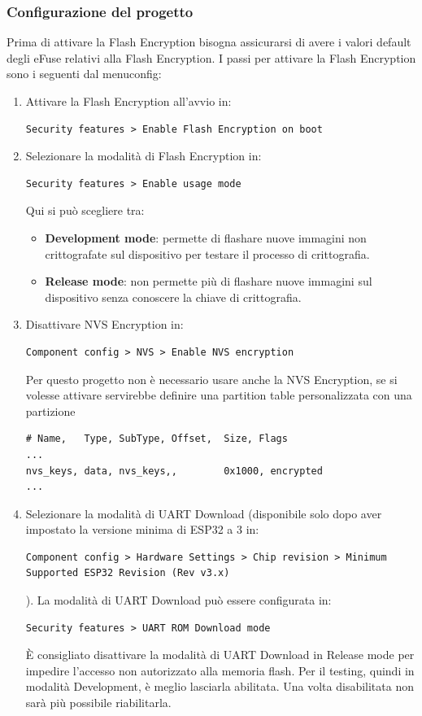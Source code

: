 \documentclass[a4paper]{article}
\begin{document}
\subsubsection{Configurazione del progetto}
Prima di attivare la Flash Encryption bisogna assicurarsi di avere i valori default degli
eFuse relativi alla Flash Encryption. I passi per attivare la Flash Encryption sono i seguenti
dal menuconfig:
\begin{enumerate}

  \item Attivare la Flash Encryption all'avvio in:
\begin{lstlisting}
Security features > Enable Flash Encryption on boot
\end{lstlisting}

  \item Selezionare la modalità di Flash Encryption in:
\begin{lstlisting}
Security features > Enable usage mode
\end{lstlisting}
    Qui si può scegliere tra:
    \begin{itemize}
      \item \textbf{Development mode}: permette di flashare nuove immagini non
        crittografate sul dispositivo per testare il processo di crittografia.
      \item \textbf{Release mode}: non permette più di flashare nuove immagini
        sul dispositivo senza conoscere la chiave di crittografia.
    \end{itemize}

  \item Disattivare NVS Encryption in:
    \begin{lstlisting}
Component config > NVS > Enable NVS encryption
    \end{lstlisting}
    Per questo progetto non è necessario usare anche la NVS Encryption, se si volesse
    attivare servirebbe definire una partition table personalizzata con una partizione
\begin{lstlisting}
# Name,   Type, SubType, Offset,  Size, Flags
...
nvs_keys, data, nvs_keys,,        0x1000, encrypted
...
\end{lstlisting}

  \item Selezionare la modalità di UART Download (disponibile solo dopo aver impostato
    la versione minima di ESP32 a 3 in:
\begin{lstlisting}
Component config > Hardware Settings > Chip revision > Minimum Supported ESP32 Revision (Rev v3.x)
\end{lstlisting}
    ).
    La modalità di UART Download può essere configurata in:
\begin{lstlisting}
Security features > UART ROM Download mode
\end{lstlisting}
    È consigliato disattivare la modalità di UART Download in Release mode per
    impedire l'accesso non autorizzato alla memoria flash. Per il testing, quindi
    in modalità Development, è meglio lasciarla abilitata. Una volta disabilitata
    non sarà più possibile riabilitarla.


\end{enumerate}
\end{document}
